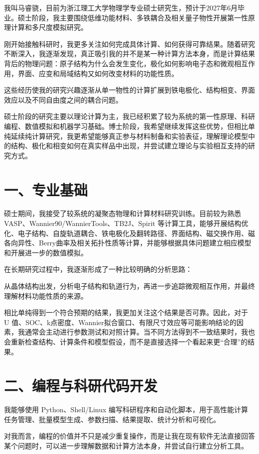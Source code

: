 我叫马睿骁，目前为浙江理工大学物理学专业硕士研究生，预计于2027年6月毕业。硕士阶段，我主要围绕低维功能材料、多铁耦合及相关量子物性开展第一性原理计算和多尺度模拟研究。

刚开始接触科研时，我更多关注如何完成具体计算、如何获得可靠结果。随着研究不断深入，我逐渐发现，真正吸引我的并不是某一种计算方法本身，而是计算结果背后的物理问题：原子结构为什么会发生变化，极化如何影响电子态和微观相互作用，界面、应变和局域结构又如何改变材料的功能性质。

这些经历使我的研究兴趣逐渐从单一物性的计算扩展到铁电极化、结构相变、界面效应以及不同自由度之间的耦合问题。

硕士阶段的研究主要以理论计算为主，我已经积累了较为系统的第一性原理、科研编程、数值模拟和机器学习基础。博士阶段，我希望继续发挥这些优势，但相比单纯延续纯计算研究，我更希望能够真正参与材料制备和实验表征，理解理论模型中的结构、极化和相变如何在真实样品中出现，并尝试建立理论与实验相互支持的研究方式。

\section{一、专业基础}

硕士期间，我接受了较系统的凝聚态物理和计算材料研究训练。目前较为熟悉 VASP、Wannier90/WannierTools、TB2J、Spirit 等计算工具，能够开展结构优化、电子结构、自旋轨道耦合、铁电极化及翻转路径、界面结构、磁交换作用、磁各向异性、Berry曲率及相关拓扑性质等计算，并能够根据具体问题建立相应模型和开展进一步的数值模拟。

在长期研究过程中，我逐渐形成了一种比较明确的分析思路：

从晶体结构出发，分析电子结构和轨道行为，再进一步追踪微观相互作用，并最终理解材料功能性质的来源。

相比单纯得到一个符合预期的结果，我更加关注这个结果是否可靠。因此，对于 U 值、SOC、k点密度、Wannier拟合窗口、有限尺寸效应等可能影响结论的因素，我通常会主动进行参数测试和对照计算。当不同方法得到不一致结果时，我也会重新检查结构、计算条件和模型假设，而不是直接选择一个看起来更“合理”的结果。

\section{二、编程与科研代码开发}

我能够使用 Python、Shell/Linux 编写科研程序和自动化脚本，用于高性能计算任务管理、批量模型生成、参数扫描、结果提取、统计分析和可视化。

对我而言，编程的价值并不只是减少重复操作，而是让我在现有软件无法直接回答某个问题时，可以进一步理解数据和计算方法本身，并尝试自行建立分析工具。

